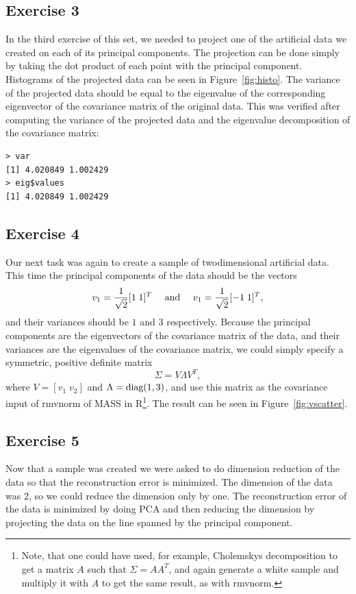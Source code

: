\documentclass{article}
\begin{document}
\subsection{Exercise 3}
In the third exercise of this set, we needed to project one of the artificial
data we created on each of its principal components. The projection can be done simply
by taking the dot product of each point with the principal component. Histograms of the
projected data can be seen in Figure~\ref{fig:histo}. The variance of
the projected data should be equal to the eigenvalue of the
corresponding eigenvector of the covariance matrix of the original
data. This was verified after computing the variance of the projected
data and the eigenvalue decomposition of the covariance matrix:
\begin{verbatim}
> var
[1] 4.020849 1.002429
> eig$values
[1] 4.020849 1.002429
\end{verbatim}
\subsection{Exercise 4}\label{sec:subsection4}
Our next task was again to create a sample of twodimensional
artificial data. This time the principal components of the data should
be the vectors 
\[
v_1 = \frac{1}{\sqrt{2}} [1 \; 1]^T \quad \textup{ and } \quad  v_1 = \frac{1}{\sqrt{2}} [-1 \; 1]^T,
\]
and their variances should be $1$ and $3$ respectively. Because the
principal components are the eigenvectors of the covariance matrix of
the data, and their variances are the eigenvalues of the covariance
matrix, we could simply specify a symmetric, positive definite matrix 
\[
\Sigma = V \Lambda V^T,
\]
where $V = [v_1 \; v_2]$ and $\Lambda = \textup{diag}(1,3)$, and use
this matrix as the covariance input of rmvnorm of MASS in R\footnote{Note, that
one could have used, for example, Cholemskys decomposition to get 
a matrix $A$ such that $\Sigma = AA^T$, and again generate a white
sample and multiply it with $A$ to get the same result, as with rmvnorm.}. The
result can be seen in Figure~\ref{fig:vscatter}. 
\subsection{Exercise 5}
Now that a sample was created we were asked to do dimension reduction
of the data so that the reconstruction error is minimized. The
dimension of the data was 2, so we could reduce the dimension only by
one. The reconstruction error of the data is minimized by doing PCA
and then reducing the dimension by projecting the data on the line
spanned by the principal component. 
\end{document}
